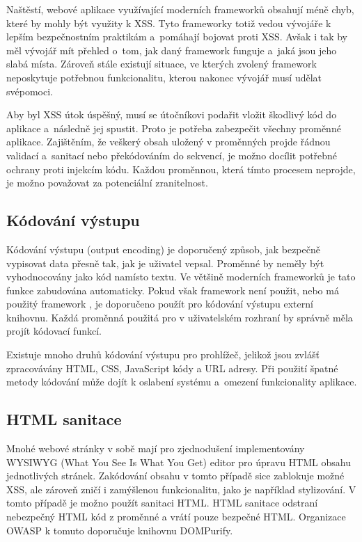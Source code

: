 \documentclass[11pt, conference, a4paper]{IEEEtran}
\begin{document}

Naštěstí, webové aplikace využívající moderních frameworků obsahují méně chyb, které by mohly být využity k XSS. Tyto frameworky totiž vedou vývojáře k lepším bezpečnostním praktikám a~pomáhají bojovat proti XSS. Avšak i tak by měl vývojář mít přehled o~tom, jak daný framework funguje a~jaká jsou jeho slabá místa. Zároveň stále existují situace, ve kterých zvolený framework neposkytuje potřebnou funkcionalitu, kterou nakonec vývojář musí udělat svépomoci.


Aby byl XSS útok úspěšný, musí se útočníkovi podařit vložit škodlivý kód do aplikace a~následně jej spustit. Proto je potřeba zabezpečit všechny proměnné aplikace. Zajištěním, že veškerý obsah uložený v proměnných projde řádnou validací a~sanitací nebo překódováním do  sekvencí, je možno docílit potřebné ochrany proti injekcím kódu. Každou proměnnou, která tímto procesem neprojde, je možno považovat za potenciální zranitelnost.

\subsection{Kódování výstupu} %
Kódování výstupu (output encoding) je doporučený způsob, jak bezpečně vypisovat data přesně tak, jak je uživatel vepsal. Proměnné by neměly být vyhodnocovány jako kód namísto textu. Ve většině moderních frameworků je tato funkce zabudována automaticky. Pokud však framework není použit, nebo má použitý framework , je doporučeno použít pro kódování výstupu externí knihovnu. Každá proměnná použitá pro v uživatelském rozhraní by správně měla projít kódovací funkcí.

Existuje mnoho druhů kódování výstupu pro prohlížeč, jelikož jsou zvlášť zpracovávány HTML, CSS, JavaScript  kódy a URL adresy. Při použití špatné metody kódování může dojít k oslabení systému a~omezení funkcionality aplikace. 



\subsection{HTML sanitace} %
Mnohé webové stránky v sobě mají pro zjednodušení implementovány WYSIWYG (What You See Is What You Get) editor pro úpravu HTML obsahu jednotlivých stránek. Zakódování obsahu v tomto případě sice zablokuje možné XSS, ale zároveň zničí i zamýšlenou funkcionalitu, jako je například stylizování. V tomto případě je možno použít sanitaci HTML. HTML sanitace odstraní nebezpečný HTML kód z proměnné a vrátí pouze bezpečné HTML. Organizace OWASP k tomuto doporučuje knihovnu DOMPurify. 
\end{document}
